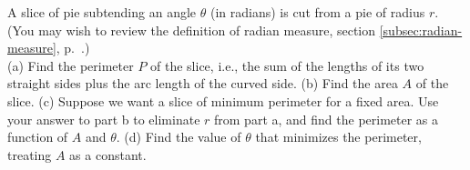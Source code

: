 A slice of pie subtending an angle $\theta$ (in radians) is cut from
a pie of radius $r$. (You may wish to review the definition of radian
measure, section \ref{subsec:radian-measure}, p.~\pageref{subsec:radian-measure}.)\\
(a) Find the perimeter $P$ of the slice, i.e., the sum of
the lengths of its two straight sides plus the arc
length of the curved side.\answercheck\hwendpart
(b) Find the area $A$ of the slice.\answercheck\hwendpart
(c) Suppose we want a slice of minimum perimeter for a fixed area.
Use your answer to part b to eliminate $r$ from part a, and
find the perimeter as a function of $A$ and $\theta$.\answercheck\hwendpart
(d) Find the value of $\theta$ that minimizes the perimeter, treating $A$ as a constant.\answercheck\hwendpart
